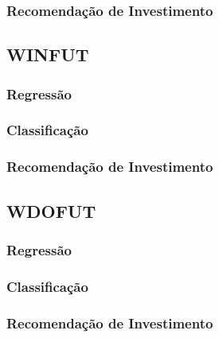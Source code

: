 \subsubsection{Recomendação de Investimento}
\subsection{WINFUT}
\subsubsection{Regressão}
\subsubsection{Classificação}
\subsubsection{Recomendação de Investimento}
\subsection{WDOFUT}
\subsubsection{Regressão}
\subsubsection{Classificação}
\subsubsection{Recomendação de Investimento}


